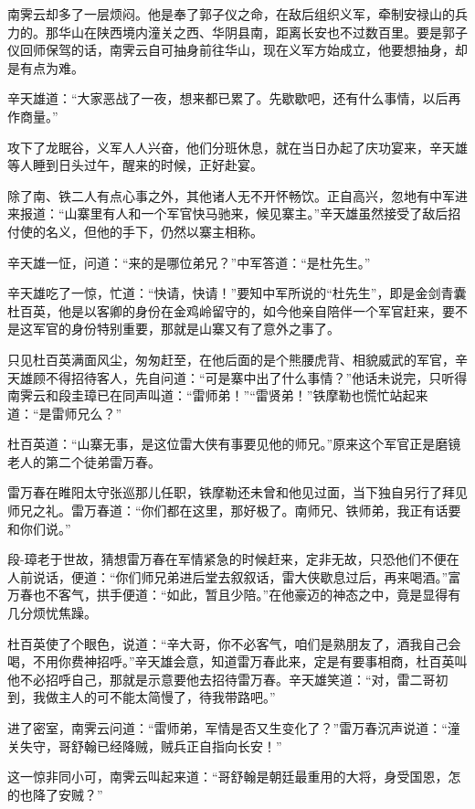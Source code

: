 \documentclass[12pt,oneside]{book}
\begin{document}
南霁云却多了一层烦闷。他是奉了郭子仪之命，在敌后组织义军，牵制安禄山的兵力的。那华山在陕西境内潼关之西、华阴县南，距离长安也不过数百里。要是郭子仪回师保驾的话，南霁云自可抽身前往华山，现在义军方始成立，他要想抽身，却是有点为难。

辛天雄道：``大家恶战了一夜，想来都已累了。先歇歇吧，还有什么事情，以后再作商量。''

攻下了龙眠谷，义军人人兴奋，他们分班休息，就在当日办起了庆功宴来，辛天雄等人睡到日头过午，醒来的时候，正好赴宴。

除了南、铁二人有点心事之外，其他诸人无不开怀畅饮。正自高兴，忽地有中军进来报道：``山寨里有人和一个军官快马驰来，候见寨主。''辛天雄虽然接受了敌后招付使的名义，但他的手下，仍然以寨主相称。

辛天雄一怔，问道：``来的是哪位弟兄？''中军答道：``是杜先生。''

辛天雄吃了一惊，忙道：``快请，快请！''要知中军所说的``杜先生''，即是金剑青囊杜百英，他是以客卿的身份在金鸡岭留守的，如今他亲自陪伴一个军官赶来，要不是这军官的身份特别重要，那就是山寨又有了意外之事了。

只见杜百英满面风尘，匆匆赶至，在他后面的是个熊腰虎背、相貌威武的军官，辛天雄顾不得招待客人，先自问道：``可是寨中出了什么事情？''他话未说完，只听得南霁云和段圭璋已在同声叫道：``雷师弟！''``雷贤弟！''铁摩勒也慌忙站起来道：``是雷师兄么？''

杜百英道：``山寨无事，是这位雷大侠有事要见他的师兄。''原来这个军官正是磨镜老人的第二个徒弟雷万春。

雷万春在睢阳太守张巡那儿任职，铁摩勒还未曾和他见过面，当下独自另行了拜见师兄之礼。雷万春道：``你们都在这里，那好极了。南师兄、铁师弟，我正有话要和你们说。''

段-璋老于世故，猜想雷万春在军情紧急的时候赶来，定非无故，只恐他们不便在人前说话，便道：``你们师兄弟进后堂去叙叙话，雷大侠歇息过后，再来喝酒。''富万春也不客气，拱手便道：``如此，暂且少陪。''在他豪迈的神态之中，竟是显得有几分烦忧焦躁。

杜百英使了个眼色，说道：``辛大哥，你不必客气，咱们是熟朋友了，酒我自己会喝，不用你费神招呼。''辛天雄会意，知道雷万春此来，定是有要事相商，杜百英叫他不必招呼自己，那就是示意要他去招待雷万春。辛天雄笑道：``对，雷二哥初到，我做主人的可不能太简慢了，待我带路吧。''

进了密室，南霁云问道：``雷师弟，军情是否又生变化了？''雷万春沉声说道：``潼关失守，哥舒翰已经降贼，贼兵正自指向长安！''

这一惊非同小可，南霁云叫起来道：``哥舒翰是朝廷最重用的大将，身受国恩，怎的也降了安贼？''
\end{document}
